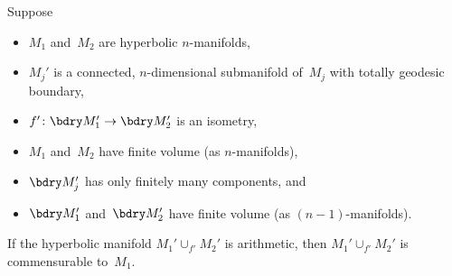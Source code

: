 \begin{thm} \label{ArithHybrid->Cup=M1}
 Suppose
 \begin{itemize}
 \item $M_1$ and~$M_2$ are hyperbolic $n$-manifolds,
 \item $M_j'$ is a connected, $n$-dimensional submanifold
of~$M_j$ with totally geodesic boundary,
 \item $f' \colon \bdry M_1' \to \bdry M_2'$ is an isometry,
 \item $M_1$ and~$M_2$ have finite volume \textup(as
$n$-manifolds\textup),
 \item $\bdry M_j'$ has only finitely many components,
 and
 \item $\bdry M_1'$ and~$\bdry M_2'$ have finite volume
\textup(as $(n-1)$-manifolds\textup).
 \end{itemize}
 If the hyperbolic manifold $M_1' \cup_{f'} M_2'$ is
arithmetic, then $M_1' \cup_{f'} M_2'$ is commensurable
to~$M_1$.
 \end{thm}


